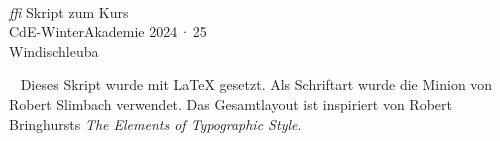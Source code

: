 \begin{titlepage}
  \centering\large
  ~
  \vfill  
  \textcolor{Maroon}{} \\ \medskip
  \vfill
  {\fontsize{180}{60}\selectfont \textcolor{black!20}{\emph{ffi}}}
  \vfill
  Skript zum Kurs\\
  CdE-WinterAkademie 2024\,·\,25\\
  Windischleuba
  \vfill
\end{titlepage}

\thispagestyle{empty}%
~%
\vfill%
\noindent Dieses Skript wurde mit \LaTeX{} gesetzt. Als Schriftart wurde die
Minion von Robert Slimbach verwendet. Das Gesamtlayout ist inspiriert von Robert
Bringhursts \emph{The Elements of Typographic Style}.
\cleardoublepage

